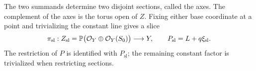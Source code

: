 The two summands determine two disjoint sections, called the axes.
The complement of the axes is the torus open of \(Z\). Fixing either
base coordinate at a point and trivializing the constant line gives
a slice
\begin{equation}\label{eq:two-slot-slice}
 \pi_{\mathrm{sl}}:Z_{\mathrm{sl}}
 =\mathbb P\bigl(\mathcal O_Y\oplus\mathcal O_Y(S_0)\bigr)\longrightarrow Y,
 \qquad P_{\mathrm{sl}}=L+q\xi_{\mathrm{sl}}.
\end{equation}
The restriction of \(P\) is identified with \(P_{\mathrm{sl}}\);
the remaining constant factor is trivialized when restricting
sections.


